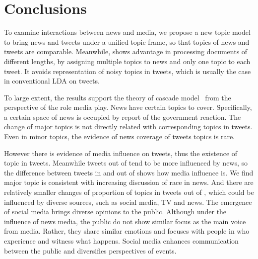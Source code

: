 \section{Conclusions}
\label{sec:conclu}

To examine interactions between news and media, we propose a new topic model \stlda to bring news and tweets under a unified topic frame, so that topics of news and tweets are comparable. Meanwhile, \stlda shows advantage in processing documents of different lengths, by assigning multiple topics to news and only one topic to each tweet. It avoids representation of noisy topics in tweets, which is usually the case in conventional LDA on tweets.

To large extent, the results support the theory of cascade model~\cite{entman1993framing} from the perspective of the role media play. News have certain topics to cover. Specifically, a certain space of news is occupied by report of the government reaction. The change of major topics is not directly related with corresponding topics in tweets. Even in minor topics, the evidence of news coverage of tweets topics is rare.

However there is evidence of media influence on tweets, thus the existence of \newsreport topic in tweets. Meanwhile tweets out of \stlouis tend to be more influenced by news, so the difference between tweets in and out of \stlouis shows how media influence is. We find major topic \racism is consistent with increasing discussion of race in news. And there are relatively smaller changes of proportion of topics in tweets out of \stlouis, which could be influenced by diverse sources, such as social media, TV and news. The emergence of social media brings diverse opinions to the public. Although under the influence of news media, the public do not show similar focus as the main voice from media. Rather, they share similar emotions and focuses with people in \stlouis who experience and witness what happens. Social media enhances communication between the public and diversifies perspectives of events.

